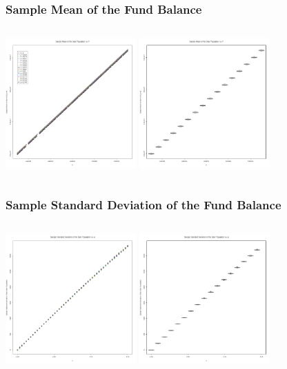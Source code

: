 \documentclass{beamer}   %
\begin{document}
\begin{frame}
  \frametitle{Sample Mean of the Fund Balance }
  \hspace*{-5mm}
  \begin{columns}
    \includegraphics[height=5cm]{meanfundBalanceByP}
    \includegraphics[height=5cm]{meanFundBalanceByP_boxplot}
  \end{columns}
\end{frame}


\begin{frame}
  \frametitle{Sample Standard Deviation of the Fund Balance}
  \hspace*{-5mm}
  \begin{columns}
    \includegraphics[height=5cm]{stdDevDeerbyAlpha}
    \includegraphics[height=5cm]{stdDevDeerbyAlpha_boxplot}
  \end{columns}
\end{frame}
\end{document}
